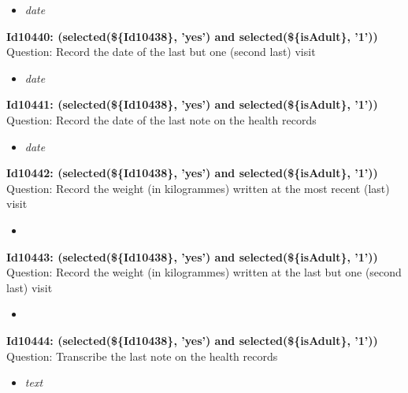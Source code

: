 \documentclass{article}%
\begin{document}
%
\begin{itemize}%
\item%
\textit{date\newline%
}%
\end{itemize}%
\textbf{Id10440: (selected(\$\{Id10438\}, 'yes') and selected(\$\{isAdult\}, '1'))\newline%
}%
Question: Record the date of the last but one (second last) visit\newline%
%
\begin{itemize}%
\item%
\textit{date\newline%
}%
\end{itemize}%
\textbf{Id10441: (selected(\$\{Id10438\}, 'yes') and selected(\$\{isAdult\}, '1'))\newline%
}%
Question: Record the date of the last note on the health records\newline%
%
\begin{itemize}%
\item%
\textit{date\newline%
}%
\end{itemize}%
\textbf{Id10442: (selected(\$\{Id10438\}, 'yes') and selected(\$\{isAdult\}, '1'))\newline%
}%
Question: Record the weight (in kilogrammes) written at the most recent (last) visit\newline%
%
\begin{itemize}%
\item%
\textit{\newline%
}%
\end{itemize}%
\textbf{Id10443: (selected(\$\{Id10438\}, 'yes') and selected(\$\{isAdult\}, '1'))\newline%
}%
Question: Record the weight (in kilogrammes) written at the last but one (second last) visit\newline%
%
\begin{itemize}%
\item%
\textit{\newline%
}%
\end{itemize}%
\textbf{Id10444: (selected(\$\{Id10438\}, 'yes') and selected(\$\{isAdult\}, '1'))\newline%
}%
Question: Transcribe the last note on the health records\newline%
%
\begin{itemize}%
\item%
\textit{text\newline%
}%
\end{itemize}%
\end{document}
